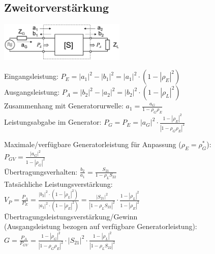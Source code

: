 \documentclass[english]{latex4ei/latex4ei_sheet}
\begin{document}
\begin{sectionbox}
	\subsection{Zweitorverstärkung}
	\begin{center}\includegraphics[width = 6cm]{./img/zweitorverstaerkung.png}\end{center}
	Eingangsleistung: $P_{E}=\left|a_{1}\right|^{2}-\left|b_{1}\right|^{2} =\left|a_{1}\right|^{2} \cdot\left(1-\left|\rho_{E}\right|^{2}\right)$\\
	Ausgangsleistung: $P_{A}=\left|b_{2}\right|^{2}-\left|a_{2}\right|^{2}=\left|b_{2}\right|^{2} \cdot\left(1-\left|\rho_{L}\right|^{2}\right)$\\

	Zusammenhang mit Generatorurwelle: $a_{1}=\frac{a_{G}}{1-\rho_{G} \rho_{E}}$\\

	Leistungsabgabe im Generator: $P_G = P_E = \left|a_{G}\right|^{2} \cdot \frac{1-\left|\rho_{E}\right|^{2}}{\left|1-\rho_{G} \rho_{E}\right|^{2}}$

	Maximale/verfügbare Generatorleistung für Anpassung ($\rho_{E}=\rho_{G}^{*}$):\\
	$P_{G V}=\frac{\left|a_{G}\right|^{2}}{1-\left|\rho_{G}\right|^{2}}$\\

	Übertragungsverhalten: $\frac{b_{2}}{a_{1}}=\frac{S_{21}}{1-\rho_{L} S_{22}}$\\

	Tatsächliche Leistungsverstärkung:\\
	$V_{P}=\frac{P_{A}}{P_{E}}=\frac{\left|b_{2}\right|^{2} \cdot\left(1-\left|\rho_{L}\right|^{2}\right)}{\left|a_{1}\right|^{2} \cdot\left(1-\left|\rho_{E}\right|^{2}\right)}=\frac{\left|S_{21}\right|^{2}}{\left|1-\rho_{L} S_{22}\right|^{2}} \cdot \frac{1-\left|\rho_{L}\right|^{2}}{1-\left|\rho_{E}\right|^{2}}$\\

	Übertragungsleistungsverstärkung/Gewinn\\(Ausgangsleistung bezogen auf verfügbare Generatorleistung):\\
	$G=\frac{P_{A}}{P_{G V}} = \frac{1-\left|\rho_{G}\right|^{2}}{\left|1-\rho_{G} \rho_{E}\right|^{2}} \cdot\left|S_{21}\right|^{2} \cdot \frac{1-\left|\rho_{L}\right|^{2}}{\left|1-\rho_{L} S_{22}\right|^{2}}$\\
	

\end{sectionbox}
\end{document}
